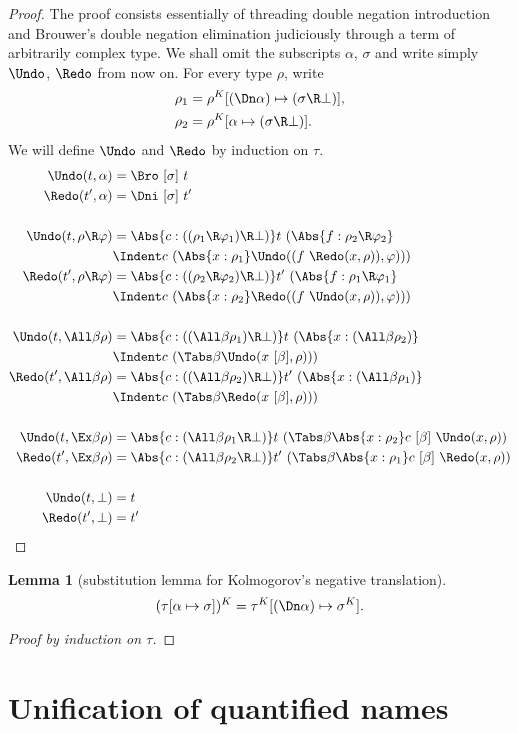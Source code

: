 \documentclass{amsart}
\let\phi=\varphi %
\newtheorem{lemma}[subsection]{Lemma}
\begin{document}
\begin{proof}
The proof consists essentially of threading double negation
introduction and Brouwer's double negation elimination
judiciously through a term of arbitrarily complex type. We shall
omit the subscripts $\alpha$, $\sigma$ and write simply $\Undo$,
$\Redo$ from now on. For every type $\rho$, write
\begin{align*}
\rho_1 & = \rho^K[(\Dn\alpha)\mapsto(\sigma\R\bot)],\\
\rho_2 & = \rho^K[\alpha\mapsto(\sigma\R\bot)].
\end{align*}
We will define $\Undo$ and $\Redo$ by induction on $\tau$.
\begin{align*}
\Undo(t,\alpha) & = \Bro~[\sigma]~t\\
\Redo(t',\alpha) & = \Dni~[\sigma]~t'\\
\\
\Undo(t,\rho\R\phi) & =
  \Abs{c : ((\rho_1 \R \phi_1) \R \bot)}
  t~(\Abs{f : \rho_2 \R \phi_2}\\
  &\Indent c~(\Abs{x : \rho_1}
  \Undo((f~\Redo(x, \rho)), \phi) ))\\
\Redo(t',\rho\R\phi) & =
  \Abs{c : ((\rho_2 \R \phi_2) \R \bot)}
  t'~(\Abs{f : \rho_1 \R \phi_1}\\
  &\Indent c~(\Abs{x : \rho_2}
  \Redo((f~\Undo(x, \rho)), \phi) ))\\
\\
\Undo(t, \All\beta \rho) & =
  \Abs{c : ((\All\beta \rho_1) \R \bot)}
  t~(\Abs{x : (\All\beta \rho_2)} \\
  &\Indent c~(\Tabs\beta \Undo(x~[\beta], \rho)) )\\
\Redo(t', \All\beta \rho) & =
  \Abs{c : ((\All\beta \rho_2) \R \bot)}
  t'~(\Abs{x : (\All\beta \rho_1)} \\
  &\Indent c~(\Tabs\beta \Redo(x~[\beta], \rho)) )\\
\\
\Undo(t, \Ex\beta \rho) & =
  \Abs{c : (\All\beta \rho_1 \R \bot)}
  t~(\Tabs\beta \Abs{x : \rho_2}
  c~[\beta]~\Undo(x,\rho) )\\
\Redo(t', \Ex\beta \rho) & =
  \Abs{c : (\All\beta \rho_2 \R \bot)}
  t'~(\Tabs\beta \Abs{x : \rho_1}
  c~[\beta]~\Redo(x,\rho) )\\
\\
\Undo(t,\bot) & = t \\
\Redo(t',\bot) & = t' \qedhere
\end{align*}
\end{proof}

\begin{lemma}
[substitution lemma for Kolmogorov's negative translation]
\label{lem:subst-kolmogorov}
\[
(\tau[\alpha\mapsto\sigma])^K =
\tau^K[(\Dn\alpha) \mapsto \sigma^K].
\]
\end{lemma}

\begin{proof}
[Proof by induction on $\tau$]
\end{proof}

\section{Unification of quantified names}
\label{sec:unify}
\end{document}
